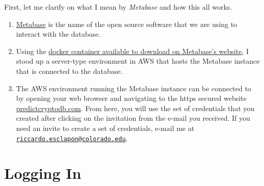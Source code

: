 \documentclass[]{book}
\begin{document}
First, let me clarify on what I mean by \emph{Metabase} and how this all works.

\begin{enumerate}
\def\labelenumi{\arabic{enumi}.}
\item
  \href{https://www.metabase.com/}{Metabase} is the name of the open source software that we are using to interact with the database.
\item
  Using the \href{https://hub.docker.com/r/metabase/metabase/}{docker container available to download on Metabase's website}, I stood up a server-type environment in AWS that hosts the Metabase instance that is connected to the database.
\item
  The AWS environment running the Metabase instance can be connected to by opening your web browser and navigating to the https secured website \href{https://predictcryptodb.com}{predictcryptodb.com}. From here, you will use the set of credentials that you created after clicking on the invitation from the e-mail you received. If you need an invite to create a set of credentials, e-mail me at \href{mailto:riccardo.esclapon@colorado.edu}{\nolinkurl{riccardo.esclapon@colorado.edu}}.
\end{enumerate}

\hypertarget{logging-in}{%
\section{Logging In}\label{logging-in}}
\end{document}

